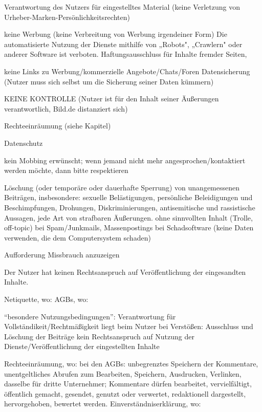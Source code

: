 	Verantwortung des Nutzers für eingestelltes Material (keine Verletzung von Urheber-Marken-Persönlichkeitsrechten)

	keine Werbung (keine Verbreitung von Werbung irgendeiner Form)
	Die automatisierte Nutzung der Dienste mithilfe von „Robots", „Crawlern" oder anderer Software ist verboten.
	Haftungsausschluss für Inhalte fremder Seiten, 
	
	
	keine Links zu Werbung/kommerzielle Angebote/Chats/Foren
	Datensicherung (Nutzer muss sich selbst um die Sicherung seiner Daten kümmern)
	
	KEINE KONTROLLE (Nutzer ist für den Inhalt seiner Äußerungen verantwortlich, Bild.de distanziert sich)
	
	Rechteeinräumung (siehe Kapitel)
	
	Datenschutz
	
	kein Mobbing erwünscht; wenn jemand nicht mehr angesprochen/kontaktiert werden möchte, dann bitte respektieren
	
	Löschung (oder temporäre oder dauerhafte Sperrung) von unangemessenen Beiträgen, insbesondere:     
	sexuelle Belästigungen, 
	persönliche Beleidigungen und Beschimpfungen,
    	Drohungen,
    	Diskriminierungen,
    	antisemitische und rassistische Aussagen,
    	jede Art von strafbaren Äußerungen.
	ohne sinnvollten Inhalt (Trolle, off-topic)
	bei Spam/Junkmails, Massenpostings
	bei Schadsoftware (keine Daten verwenden, die dem Computersystem schaden)
	
	Aufforderung Missbrauch anzuzeigen
	
	Der Nutzer hat keinen Rechtsanspruch auf Veröffentlichung der eingesandten Inhalte.

	Netiquette, wo: 
	AGBs, wo: 
	
	
	
	``besondere Nutzungsbedingungen'':
			Verantwortung für Vollständikeit/Rechtmäßigkeit liegt beim Nutzer
			bei Verstößen: Ausschluss und Löschung der Beiträge
			kein Rechtsanspruch auf Nutzung der Dienste/Veröffentlichung der eingestellten Inhalte
			
			
			
			
	Rechteeinräumung, wo: bei den AGBs: unbegrenztes Speichern der Kommentare, unentgeltliches Abrufen zum Bearbeiten, Speichern, Ausdrucken, Verlinken, 										dasselbe für dritte Unternehmer; Kommentare dürfen bearbeitet, vervielfältigt, öffentlich gemacht, gesendet, genutzt oder 										verwertet, redaktionell dargestellt, hervorgehoben, bewertet werden.
	Einverständniserklärung, wo:
	
